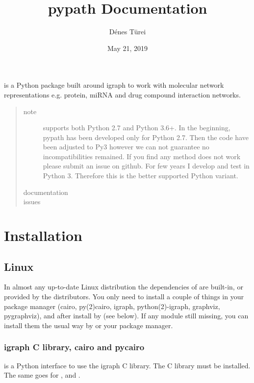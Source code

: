 \documentclass[letterpaper,10pt,english]{sphinxmanual}
\title{pypath Documentation}
\date{May 21, 2019}
\author{Dénes Türei}
\begin{document}
\pagestyle{empty}
\sphinxmaketitle
\pagestyle{plain}
\sphinxtableofcontents
\pagestyle{normal}
\label{\detokenize{index::doc}}


 is a Python package built around igraph to work with molecular
network representations e.g. protein, miRNA and drug compound interaction
networks.
\begin{quote}\begin{description}
\item[{note}] \leavevmode
{} supports both Python 2.7 and Python 3.6+. In the beginning,
pypath has been developed only for Python 2.7. Then the code have been
adjusted to Py3 however we can not guarantee no incompatibilities
remained. If you find any method does not work please submit an issue on
github. For few years I develop and test  in Python 3. Therefore
this is the better supported Python variant.

\item[{documentation}] \leavevmode
{}

\item[{issues}] \leavevmode
{}

\end{description}\end{quote}


\chapter{Installation}
\label{\detokenize{installation:installation}}\label{\detokenize{installation::doc}}

\section{Linux}
\label{\detokenize{installation:linux}}
In almost any up-to-date Linux distribution the dependencies of  are
built-in, or provided by the distributors. You only need to install a couple
of things in your package manager (cairo, py(2)cairo, igraph,
python(2)-igraph, graphviz, pygraphviz), and after install  by 
(see below). If any module still missing, you can install them the usual way
by  or your package manager.


\subsection{igraph C library, cairo and pycairo}
\label{\detokenize{installation:igraph-c-library-cairo-and-pycairo}}
 is a Python interface to use the igraph C library. The
C library must be installed. The same goes for ,  and
.
\end{document}
